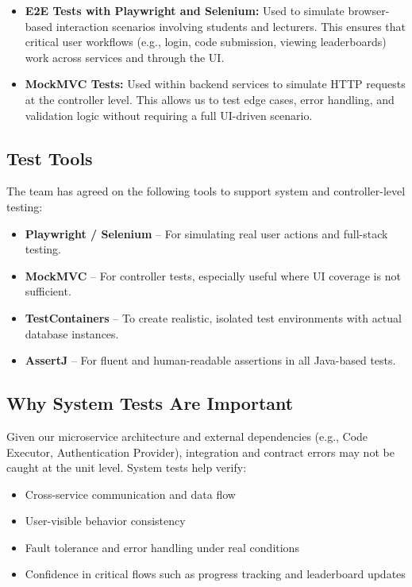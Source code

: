 \begin{itemize}
    \item \textbf{E2E Tests with Playwright and Selenium:} Used to simulate browser-based interaction scenarios involving students and lecturers. This ensures that critical user workflows (e.g., login, code submission, viewing leaderboards) work across services and through the UI.

    \item \textbf{MockMVC Tests:} Used within backend services to simulate HTTP requests at the controller level. This allows us to test edge cases, error handling, and validation logic without requiring a full UI-driven scenario.
\end{itemize}

\subsection*{Test Tools}
The team has agreed on the following tools to support system and controller-level testing:

\begin{itemize}
    \item \textbf{Playwright / Selenium} – For simulating real user actions and full-stack testing.
    \item \textbf{MockMVC} – For controller tests, especially useful where UI coverage is not sufficient.
    \item \textbf{TestContainers} – To create realistic, isolated test environments with actual database instances.
    \item \textbf{AssertJ} – For fluent and human-readable assertions in all Java-based tests.
\end{itemize}

\subsection*{Why System Tests Are Important}

Given our microservice architecture and external dependencies (e.g., Code Executor, Authentication Provider), integration and contract errors may not be caught at the unit level. System tests help verify:

\begin{itemize}
    \item Cross-service communication and data flow
    \item User-visible behavior consistency
    \item Fault tolerance and error handling under real conditions
    \item Confidence in critical flows such as progress tracking and leaderboard updates
\end{itemize}
